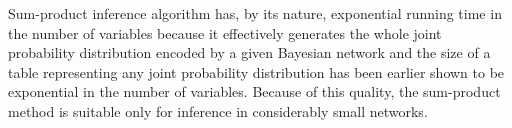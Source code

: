 \documentclass[english,cover]{fitthesis} %
\newcommand{\vars}[1]{{\bold{#1}}}         %
\newcommand{\uncertain}[1]{{\color{magenta}#1}}
\begin{document}
Sum-product inference algorithm has, by its nature, exponential running time in the number of variables because it effectively generates the whole joint probability distribution encoded by a given Bayesian network and the size of a table representing any joint probability distribution has been earlier shown to be exponential in the number of variables. Because of this quality, the sum-product method is suitable only for inference in considerably small networks.

\end{document}
